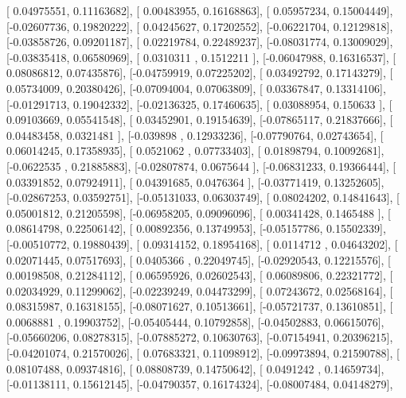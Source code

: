 \documentclass{article}
\begin{document}
       [ 0.04975551,  0.11163682],
       [ 0.00483955,  0.16168863],
       [ 0.05957234,  0.15004449],
       [-0.02607736,  0.19820222],
       [ 0.04245627,  0.17202552],
       [-0.06221704,  0.12129818],
       [-0.03858726,  0.09201187],
       [ 0.02219784,  0.22489237],
       [-0.08031774,  0.13009029],
       [-0.03835418,  0.06580969],
       [ 0.0310311 ,  0.1512211 ],
       [-0.06047988,  0.16316537],
       [ 0.08086812,  0.07435876],
       [-0.04759919,  0.07225202],
       [ 0.03492792,  0.17143279],
       [ 0.05734009,  0.20380426],
       [-0.07094004,  0.07063809],
       [ 0.03367847,  0.13314106],
       [-0.01291713,  0.19042332],
       [-0.02136325,  0.17460635],
       [ 0.03088954,  0.150633  ],
       [ 0.09103669,  0.05541548],
       [ 0.03452901,  0.19154639],
       [-0.07865117,  0.21837666],
       [ 0.04483458,  0.0321481 ],
       [-0.039898  ,  0.12933236],
       [-0.07790764,  0.02743654],
       [ 0.06014245,  0.17358935],
       [ 0.0521062 ,  0.07733403],
       [ 0.01898794,  0.10092681],
       [-0.0622535 ,  0.21885883],
       [-0.02807874,  0.0675644 ],
       [-0.06831233,  0.19366444],
       [ 0.03391852,  0.07924911],
       [ 0.04391685,  0.0476364 ],
       [-0.03771419,  0.13252605],
       [-0.02867253,  0.03592751],
       [-0.05131033,  0.06303749],
       [ 0.08024202,  0.14841643],
       [ 0.05001812,  0.21205598],
       [-0.06958205,  0.09096096],
       [ 0.00341428,  0.1465488 ],
       [ 0.08614798,  0.22506142],
       [ 0.00892356,  0.13749953],
       [-0.05157786,  0.15502339],
       [-0.00510772,  0.19880439],
       [ 0.09314152,  0.18954168],
       [ 0.0114712 ,  0.04643202],
       [ 0.02071445,  0.07517693],
       [ 0.0405366 ,  0.22049745],
       [-0.02920543,  0.12215576],
       [ 0.00198508,  0.21284112],
       [ 0.06595926,  0.02602543],
       [ 0.06089806,  0.22321772],
       [ 0.02034929,  0.11299062],
       [-0.02239249,  0.04473299],
       [ 0.07243672,  0.02568164],
       [ 0.08315987,  0.16318155],
       [-0.08071627,  0.10513661],
       [-0.05721737,  0.13610851],
       [ 0.0068881 ,  0.19903752],
       [-0.05405444,  0.10792858],
       [-0.04502883,  0.06615076],
       [-0.05660206,  0.08278315],
       [-0.07885272,  0.10630763],
       [-0.07154941,  0.20396215],
       [-0.04201074,  0.21570026],
       [ 0.07683321,  0.11098912],
       [-0.09973894,  0.21590788],
       [ 0.08107488,  0.09374816],
       [ 0.08808739,  0.14750642],
       [ 0.0491242 ,  0.14659734],
       [-0.01138111,  0.15612145],
       [-0.04790357,  0.16174324],
       [-0.08007484,  0.04148279],
\end{document}
